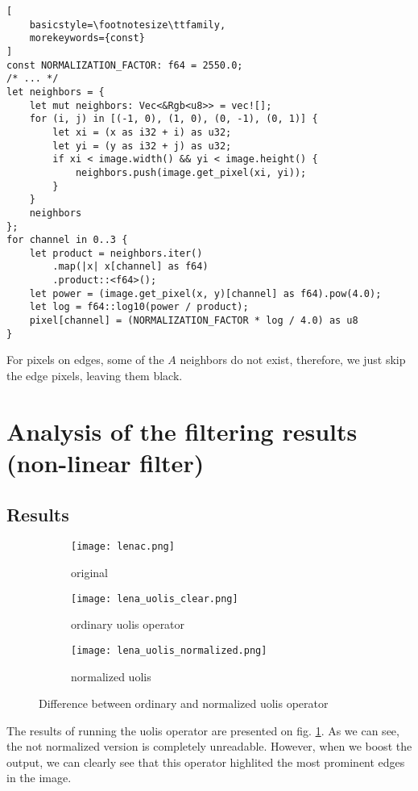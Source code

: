 \documentclass[12pt]{article}
\begin{document}
\begin{lstlisting}[
    basicstyle=\footnotesize\ttfamily,
    morekeywords={const}
]
const NORMALIZATION_FACTOR: f64 = 2550.0;
/* ... */
let neighbors = {
    let mut neighbors: Vec<&Rgb<u8>> = vec![];
    for (i, j) in [(-1, 0), (1, 0), (0, -1), (0, 1)] {
        let xi = (x as i32 + i) as u32;
        let yi = (y as i32 + j) as u32;
        if xi < image.width() && yi < image.height() {
            neighbors.push(image.get_pixel(xi, yi));
        }
    }
    neighbors
};
for channel in 0..3 {
    let product = neighbors.iter()
        .map(|x| x[channel] as f64)
        .product::<f64>();
    let power = (image.get_pixel(x, y)[channel] as f64).pow(4.0);
    let log = f64::log10(power / product);
    pixel[channel] = (NORMALIZATION_FACTOR * log / 4.0) as u8
}
\end{lstlisting}

For pixels on edges, some of the $A$ neighbors do not exist, therefore, we just skip the edge pixels, leaving them black.

\section{Analysis of the filtering results (non-linear filter)}
\subsection{Results}



\begin{figure}[H]\centering
    \hfill
    \begin{subfigure}[t]{\subfiguresize}
        \texttt{[image: lenac.png]}
        \caption{original}
    \end{subfigure}
    \hfill
    \begin{subfigure}[t]{\subfiguresize}
        \texttt{[image: lena\_uolis\_clear.png]}
        \caption{ordinary uolis operator}
    \end{subfigure}
    \hfill
    \begin{subfigure}[t]{\subfiguresize}
        \texttt{[image: lena\_uolis\_normalized.png]}
        \caption{normalized uolis}
    \end{subfigure}
    \hfill
    \caption{Difference between ordinary and normalized uolis operator}
    \label{fig:uolis}
\end{figure}

The results of running the uolis operator are presented on fig. \ref{fig:uolis}.
As we can see, the not normalized version is completely unreadable.
However, when we boost the output,
we can clearly see that this operator highlited the most prominent edges in the image.
\end{document}
